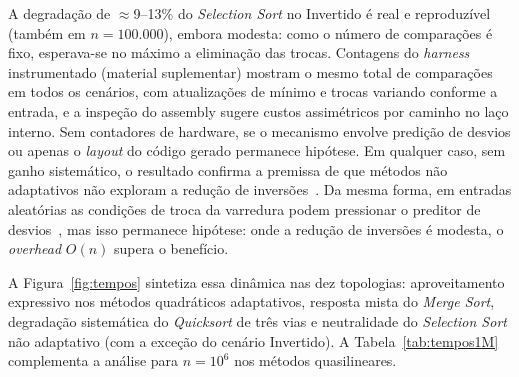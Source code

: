 \documentclass[portuguese]{sbc2025}%
\begin{document}
A degradação de $\approx$9--13\% do \emph{Selection Sort} no Invertido é real e reproduzível (também em $n{=}100.000$), embora modesta: como o número de comparações é fixo, esperava-se no máximo a eliminação das trocas. Contagens do \emph{harness} instrumentado (material suplementar) mostram o mesmo total de comparações em todos os cenários, com atualizações de mínimo e trocas variando conforme a entrada, e a inspeção do assembly sugere custos assimétricos por caminho no laço interno. Sem contadores de hardware, se o mecanismo envolve predição de desvios ou apenas o \emph{layout} do código gerado permanece hipótese. Em qualquer caso, sem ganho sistemático, o resultado confirma a premissa de que métodos não adaptativos não exploram a redução de inversões~\citep{estivill-castro_survey_1992}. Da mesma forma, em entradas aleatórias as condições de troca da varredura podem pressionar o preditor de desvios~\citep{edelkamp_blockquicksort_2016, kaligosi_branch_2006}, mas isso permanece hipótese: onde a redução de inversões é modesta, o \emph{overhead} $O(n)$ supera o benefício.

A Figura~\ref{fig:tempos} sintetiza essa dinâmica nas dez topologias: aproveitamento expressivo nos métodos quadráticos adaptativos, resposta mista do \emph{Merge Sort}, degradação sistemática do \emph{Quicksort} de três vias e neutralidade do \emph{Selection Sort} não adaptativo (com a exceção do cenário Invertido). A Tabela~\ref{tab:tempos1M} complementa a análise para $n{=}10^6$ nos métodos quasilineares.
\end{document}
